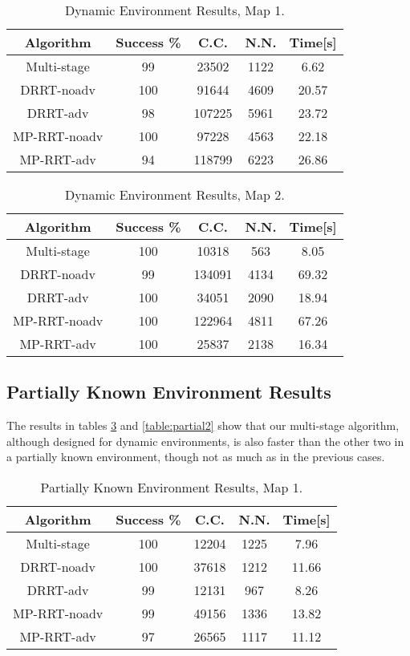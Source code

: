 \documentclass[10pt, conference, compsoc]{IEEEtran}
\begin{document}
\begin{table}[ht]
\caption{Dynamic Environment Results, Map 1.}
\label{table:dynamic1}
\centering
\begin{tabular}{|c||c|c|c|c|}
\hline
Algorithm & Success \% & C.C. & N.N. & Time[s]\\
\hline
Multi-stage & 99 & 23502 & 1122 & 6.62 \\ 
\hline
DRRT-noadv & 100 & 91644 & 4609 & 20.57 \\
\hline
DRRT-adv & 98 & 107225 & 5961 & 23.72 \\
\hline
MP-RRT-noadv & 100 & 97228 & 4563 & 22.18\\
\hline
MP-RRT-adv & 94 & 118799 & 6223 & 26.86\\
\hline
\end{tabular}
\end{table}

\begin{table}[ht]
\caption{Dynamic Environment Results, Map 2.}
\label{table:dynamic2}
\centering
\begin{tabular}{|c||c|c|c|c|}
\hline
Algorithm & Success \% & C.C. & N.N. & Time[s]\\
\hline
Multi-stage & 100 & 10318 & 563 & 8.05\\ 
\hline
DRRT-noadv & 99 & 134091 & 4134 & 69.32\\
\hline
DRRT-adv & 100 & 34051 & 2090 & 18.94\\
\hline
MP-RRT-noadv & 100 & 122964 & 4811 & 67.26\\
\hline
MP-RRT-adv & 100 & 25837 & 2138 & 16.34\\
\hline
\end{tabular}
\end{table}

\subsection{Partially Known Environment Results}
The results in tables \ref{table:partial1} and \ref{table:partial2} show that our multi-stage
algorithm, although designed for dynamic environments, is also faster than the
other two in a partially known environment, though not as much as in the
previous cases.

\begin{table}[ht]
\caption{Partially Known Environment Results, Map 1.}
\label{table:partial1}
\centering
\begin{tabular}{|c||c|c|c|c|}
\hline
Algorithm & Success \% & C.C. & N.N. & Time[s]\\
\hline
Multi-stage & 100 & 12204 & 1225 & 7.96\\ 
\hline
DRRT-noadv & 100 & 37618 & 1212 & 11.66\\
\hline
DRRT-adv & 99 & 12131 & 967 & 8.26\\
\hline
MP-RRT-noadv & 99 & 49156 & 1336 & 13.82\\
\hline
MP-RRT-adv & 97 & 26565 & 1117 & 11.12\\
\hline
\end{tabular}
\end{table}
\end{document}

